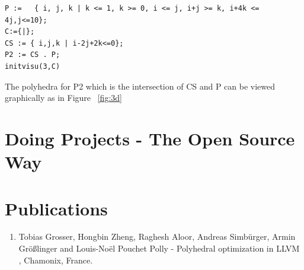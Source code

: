 \documentclass[MTech]{iitmdiss}
\begin{document}
{\footnotesize
\begin{lstlisting}
P :=   { i, j, k | k <= 1, k >= 0, i <= j, i+j >= k, i+4k <= 4j,j<=10};
C:={|};
CS := { i,j,k | i-2j+2k<=0};
P2 := CS . P;
initvisu(3,C)
\end{lstlisting}
}
The polyhedra for P2 which is the intersection of CS and P can be viewed graphically as in 
Figure ~\ref{fig:3d}

\chapter{Doing Projects - The Open Source Way}
 

\chapter*{Publications}
\vspace{-0.3cm}

\begin{enumerate}
\item Tobias Grosser, Hongbin Zheng, Raghesh Aloor, Andreas Simb{\"u}rger, Armin {G}r{\"o}{\ss}linger and Louis-No{\"e}l Pouchet \newblock
  Polly - Polyhedral optimization in LLVM , Chamonix, France.
\end{enumerate}


\pagebreak
\begin{singlespace}
  \begin{small}
	
%
  \end{small}
\end{singlespace}

\end{document}
